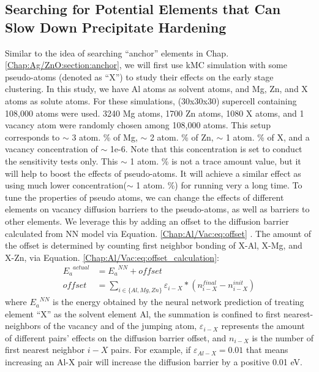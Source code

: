 \subsection{Searching for Potential Elements that Can Slow Down Precipitate Hardening}
\label{Chap:Al/Vac:pseudo}
Similar to the idea of searching ``anchor'' elements in Chap. \ref{Chap:Ag/ZnO:section:anchor}, we will first use \ac{kMC} simulation with some pseudo-atoms (denoted as ``X'') to study their effects on the early stage clustering. In this study, we have Al atoms as solvent atoms, and Mg, Zn, and X atoms as solute atoms. For these simulations, (30x30x30) supercell containing 108,000 atoms were used. 3240 Mg atoms, 1700 Zn atoms, 1080 X atoms, and 1 vacancy atom were randomly chosen among 108,000 atoms. This setup corresponds to $\sim$ 3 atom. \% of Mg, $\sim$ 2 atom. \% of Zn, $\sim$ 1 atom. \% of X, and a vacancy concentration of $\sim$ 1e-6. Note that this concentration is set to conduct the sensitivity tests only. This $\sim$ 1 atom. \% is not a trace amount value, but it will help to boost the effects of pseudo-atoms. It will achieve a similar effect as using much lower concentration($\sim$ 1 atom. \%) for running very a long time. To tune the properties of pseudo atoms, we can change the effects of different elements on vacancy diffusion barriers to the pseudo-atoms, as well as barriers to other elements. We leverage this by adding an offset to the diffusion barrier calculated from \ac{NN} model via Equation. \ref{Chap:Al/Vac:eq:offset} . The amount of the offset is determined by counting first neighbor bonding of X-Al, X-Mg, and X-Zn, via Equation. \ref{Chap:Al/Vac:eq:offset_calculation}:
\begin{subequations}
\begin{align}
{E_a}^{actual} & = {E_a}^{NN} + \textit{offset} \label{Chap:Al/Vac:eq:offset} \\
\textit{offset} & = \sum_{i\in\{Al, Mg, Zn\}} \varepsilon_{i-X} * ( n_{i-X}^{final} - n_{i-X}^{init}) \label{Chap:Al/Vac:eq:offset_calculation}
\end{align}
\end{subequations}
where ${E_a}^{NN}$ is the energy obtained by the neural network prediction of treating element ``X'' as the solvent element Al, the summation is confined to first nearest-neighbors of the vacancy and of the jumping atom, $\varepsilon_{i-X}$ represents the amount of different pairs' effects on the diffusion barrier offset, and $n_{i-X}$ is the number of first nearest neighbor $i-X$ pairs. For example, if $\varepsilon_{Al-X} = 0.01$ that means increasing an Al-X pair will increase the diffusion barrier by a positive 0.01 eV.


